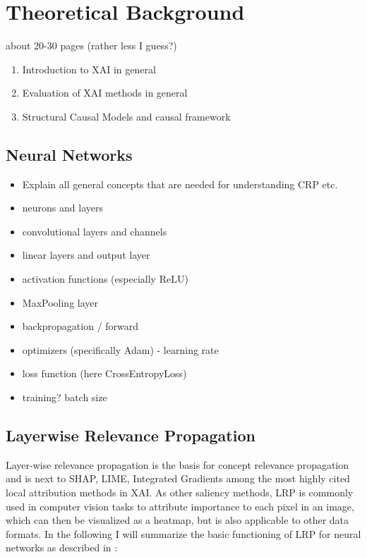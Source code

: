 \chapter{Theoretical Background}\label{chapter:background}

{ \color{red}

    about 20-30 pages (rather less I guess?)

    \begin{enumerate}
        \item Introduction to XAI in general
        \item Evaluation of XAI methods in general
        \item Structural Causal Models and causal framework
    \end{enumerate}
}

\section{Neural Networks}
\begin{itemize}
    \item Explain all general concepts that are needed for understanding CRP etc. 
    \item neurons and layers
    \item convolutional layers and channels
    \item linear layers and output layer
    \item activation functions (especially ReLU)
    \item MaxPooling layer 
    \item backpropagation / forward
    \item optimizers (specifically Adam) - learning rate
    \item loss function (here CrossEntropyLoss)
    \item training? batch size
\end{itemize}

\section{Layerwise Relevance Propagation}
Layer-wise relevance propagation \cite{Bach2015} is the basis for concept relevance propagation and is next to SHAP, LIME, Integrated Gradients  among the most highly cited local attribution methods in XAI. As other saliency methods, LRP is commonly used in computer vision tasks to attribute importance to each pixel in an image, which can then be visualized as a heatmap, but is also applicable to other data formats. In the following I will summarize the basic functioning of LRP for neural networks as described in \cite{Bach2015}:

